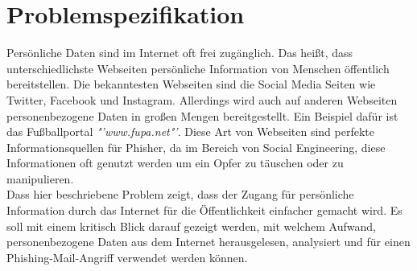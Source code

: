 

\chapter{Problemspezifikation}  %
\label{cha:Problemspezifikation} %
Persönliche Daten sind im Internet oft frei zugänglich. Das heißt, dass unterschiedlichste Webseiten persönliche Information von Menschen öffentlich bereitstellen. Die bekanntesten Webseiten sind die Social Media Seiten wie Twitter, Facebook und Instagram. Allerdings wird auch auf anderen Webseiten personenbezogene Daten in großen Mengen bereitgestellt. Ein Beispiel dafür ist das Fußballportal \textit{"'www.fupa.net"'}. Diese Art von Webseiten sind perfekte Informationsquellen für Phisher, da im Bereich von Social Engineering, diese Informationen oft genutzt werden um ein Opfer zu täuschen oder zu manipulieren.\\
Dass hier beschriebene Problem zeigt, dass der Zugang für persönliche Information durch das Internet für die Öffentlichkeit einfacher gemacht wird. Es soll mit einem kritisch Blick darauf gezeigt werden, mit welchem Aufwand, personenbezogene Daten aus dem Internet herausgelesen, analysiert und für einen Phishing-Mail-Angriff verwendet werden können.
